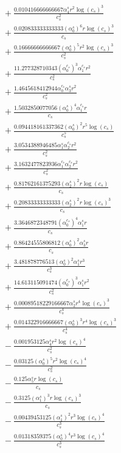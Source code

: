 \documentclass[10pt]{article}
\begin{document}
\begin{align*}
&{}  + \frac{0.010416666666667 \alpha_{4}^s r^{2} \log{\left(c_{s} \right)}^{3}}{c_{s}^{2}} \\
&{}  + \frac{0.020833333333333 \left(\alpha_{0}^s\right)^{6} r \log{\left(c_{s} \right)}^{3}}{c_{s}} \\
&{}  + \frac{0.16666666666667 \left(\alpha_{0}^s\right)^{5} r^{2} \log{\left(c_{s} \right)}^{3}}{c_{s}^{2}} \\
&{}  + \frac{11.277328710343 \left(\alpha_{0}^{c_s}\right)^{3} \alpha_{1}^{c_s} r^{2}}{c_{s}^{2}} \\
&{}  + \frac{1.4645618412944 \alpha_{0}^{c_s} \alpha_{3}^s r^{2}}{c_{s}^{2}} \\
&{}  + \frac{1.5032850077056 \left(\alpha_{0}^s\right)^{4} \alpha_{1}^{c_s} r}{c_{s}} \\
&{}  + \frac{0.094418161337362 \left(\alpha_{0}^s\right)^{2} r^{5} \log{\left(c_{s} \right)}}{c_{s}^{5}} \\
&{}  + \frac{3.0534388946485 \alpha_{1}^s \alpha_{2}^{c_s} r^{2}}{c_{s}^{2}} \\
&{}  + \frac{3.1632477823936 \alpha_{1}^{c_s} \alpha_{2}^{c_s} r^{2}}{c_{s}^{2}} \\
&{}  + \frac{0.81762161375293 \left(\alpha_{2}^s\right)^{2} r \log{\left(c_{s} \right)}}{c_{s}} \\
&{}  + \frac{0.20833333333333 \left(\alpha_{2}^s\right)^{2} r \log{\left(c_{s} \right)}^{3}}{c_{s}} \\
&{}  + \frac{3.3646872348791 \left(\alpha_{0}^{c_s}\right)^{4} \alpha_{1}^s r}{c_{s}} \\
&{}  + \frac{0.86424555806812 \left(\alpha_{0}^s\right)^{2} \alpha_{3}^s r}{c_{s}} \\
&{}  + \frac{3.481878776513 \left(\alpha_{0}^s\right)^{2} \alpha_{1}^s r^{3}}{c_{s}^{3}} \\
&{}  + \frac{14.613115091474 \left(\alpha_{0}^{c_s}\right)^{3} \alpha_{1}^s r^{2}}{c_{s}^{2}} \\
&{}  + \frac{0.00089518229166667 \alpha_{2}^s r^{4} \log{\left(c_{s} \right)}^{3}}{c_{s}^{4}} \\
&{}  + \frac{0.014322916666667 \left(\alpha_{0}^s\right)^{3} r^{4} \log{\left(c_{s} \right)}^{3}}{c_{s}^{4}} \\
&{}  - \frac{0.001953125 \alpha_{4}^s r^{2} \log{\left(c_{s} \right)}^{4}}{c_{s}^{2}} \\
&{}  - \frac{0.03125 \left(\alpha_{0}^s\right)^{5} r^{2} \log{\left(c_{s} \right)}^{4}}{c_{s}^{2}} \\
&{}  - \frac{0.125 \alpha_{5}^s r \log{\left(c_{s} \right)}}{c_{s}} \\
&{}  - \frac{0.3125 \left(\alpha_{1}^s\right)^{3} r \log{\left(c_{s} \right)}^{3}}{c_{s}} \\
&{}  - \frac{0.00439453125 \left(\alpha_{1}^s\right)^{2} r^{3} \log{\left(c_{s} \right)}^{4}}{c_{s}^{3}} \\
&{}  - \frac{0.01318359375 \left(\alpha_{0}^s\right)^{4} r^{3} \log{\left(c_{s} \right)}^{4}}{c_{s}^{3}}
\end{align*}
\end{document}
